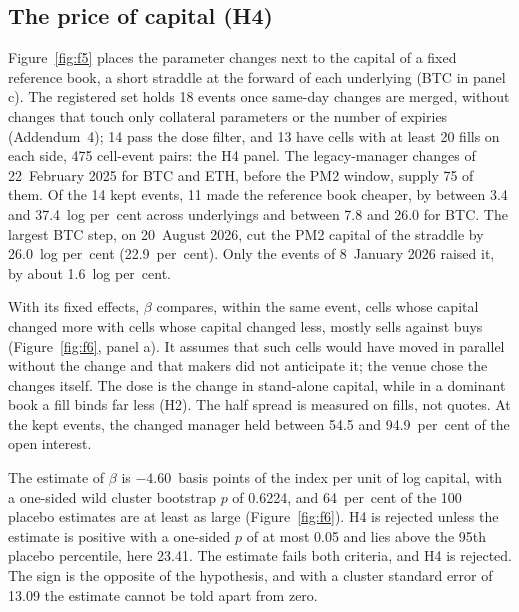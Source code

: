 \documentclass[a4paper,fleqn]{cas-dc}
\begin{document}
\subsection{The price of capital (H4)}\label{sec:h4}
Figure~\ref{fig:f5} places the parameter changes next to the capital of a fixed reference book, a short
straddle at the forward of each underlying (BTC in panel c). The registered set holds 18 events once same-day changes
are merged, without changes that touch only collateral parameters or the number of expiries
(Addendum~4); 14 pass the dose filter, and 13 have cells with at least 20 fills on each side, 475 cell-event
pairs: the H4 panel. The legacy-manager changes of 22~February 2025 for BTC and ETH, before the PM2
window, supply 75 of them. Of the 14 kept events, 11 made the reference book cheaper, by between 3.4 and
37.4~log per~cent across underlyings and between 7.8 and 26.0 for BTC. The largest BTC step, on 20~August 2026,
cut the PM2 capital of the straddle by 26.0~log per~cent (22.9~per~cent). Only the events of 8~January 2026
raised it, by about 1.6~log per~cent.

With its fixed effects, $\beta$ compares, within the same event, cells whose capital changed more with cells
whose capital changed less, mostly sells against buys (Figure~\ref{fig:f6}, panel a). It assumes that such
cells would have moved in parallel without the change and that makers did not anticipate it; the venue chose
the changes itself. The dose is the change in stand-alone capital, while in a dominant book a fill binds far
less (H2). The half spread is measured on fills, not quotes. At the kept events, the changed manager held
between 54.5 and 94.9~per~cent of the open interest.

The estimate of $\beta$ is $-4.60$~basis points of the index per unit of log capital, with a one-sided wild
cluster bootstrap $p$ of 0.6224, and 64~per~cent of the 100 placebo estimates are at least as large
(Figure~\ref{fig:f6}). H4 is rejected unless the estimate is positive with a one-sided $p$ of at most 0.05 and
lies above the 95th placebo percentile, here 23.41. The estimate fails both criteria, and H4 is rejected. The
sign is the opposite of the hypothesis, and with a cluster standard error of 13.09 the estimate cannot be told
apart from zero.
\end{document}
